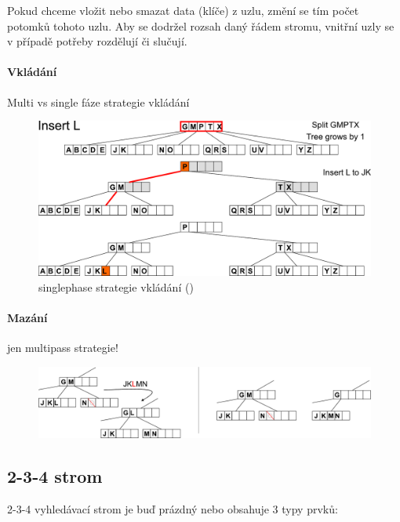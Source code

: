 Pokud chceme vložit nebo smazat data (klíče) z uzlu, změní se tím počet potomků tohoto uzlu. Aby se dodržel rozsah daný řádem stromu, vnitřní uzly se v případě potřeby rozdělují či slučují.

\paragraph{Vkládání} Multi vs single fáze strategie vkládání

\begin{figure}[h]
    \begin{center}
        \includegraphics[width=130mm]{spolecne/03/images/btree-insert}
    \end{center}
    \caption{singlephase strategie vkládání ()}
\end{figure}

\paragraph{Mazání} jen multipass strategie!

\begin{figure}[h]
    \begin{center}
        \includegraphics[width=140mm]{spolecne/03/images/btree-delete}
    \end{center}
\end{figure}

\subsection{2-3-4 strom}
2-3-4 vyhledávací strom je buď prázdný nebo obsahuje 3 typy prvků:

